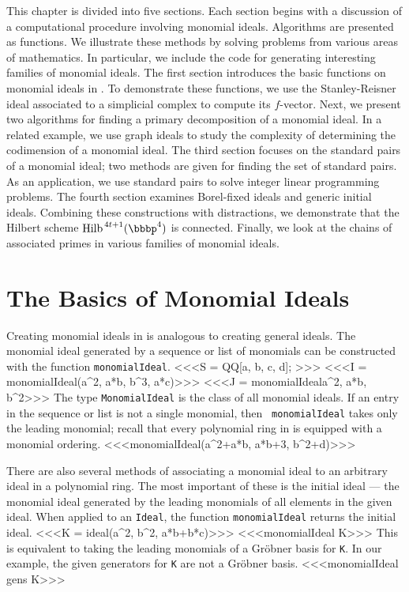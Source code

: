 This chapter is divided into five sections.  Each section begins with
a discussion of a computational procedure involving monomial ideals.
Algorithms are presented as \Mtwo functions.  We illustrate these
methods by solving problems from various areas of mathematics.
In particular, we include the \Mtwo code for generating interesting
families of monomial ideals.  The first section introduces the basic
functions on monomial ideals in \Mtwo.  To demonstrate these functions,
we use the Stanley-Reisner ideal associated to a simplicial complex to
compute its $f$-vector.  Next, we present two algorithms for finding a
primary decomposition of a monomial ideal.  In a related example, we
use graph ideals to study the complexity of determining the
codimension of a monomial ideal.  The third section focuses on the
standard pairs of a monomial ideal; two methods are given for finding
the set of standard pairs.  As an application, we use standard pairs
to solve integer linear programming problems.  The fourth section
examines Borel-fixed ideals and generic initial ideals.  Combining
these constructions with distractions, we demonstrate that the Hilbert
scheme $\Hilb^{\, 4t+1}(\bbbp^{4})$ is connected.  Finally, we look at
the chains of associated primes in various families of monomial
ideals.


\section{The Basics of Monomial Ideals}

Creating monomial ideals in \Mtwo is analogous to creating general
ideals.  The monomial ideal generated by a sequence or list of
monomials can be constructed with the function {\tt monomialIdeal}.
<<<S = QQ[a, b, c, d]; >>>
<<<I = monomialIdeal(a^2, a*b, b^3, a*c)>>>
<<<J = monomialIdeal{a^2, a*b, b^2}>>>
The type {\tt MonomialIdeal} is the class of all monomial ideals.  If
an entry in the sequence or list is not a single monomial, then {\tt
monomialIdeal} takes only the leading monomial; recall that every
polynomial ring in \Mtwo is equipped with a monomial ordering.
<<<monomialIdeal(a^2+a*b, a*b+3, b^2+d)>>>

There are also several methods of associating a monomial
ideal to an arbitrary ideal in a polynomial ring.  The most important
of these is the initial ideal --- the monomial ideal generated by the
leading monomials of all elements in the given ideal.  When applied to
an {\tt Ideal}, the function {\tt monomialIdeal} returns the initial
ideal.
<<<K = ideal(a^2, b^2, a*b+b*c)>>>
<<<monomialIdeal K>>>
This is equivalent to taking the leading monomials of a Gr\"{o}bner
basis for {\tt K}.  In our example, the given
generators for {\tt K} are not a Gr\"{o}bner basis.
<<<monomialIdeal gens K>>>

